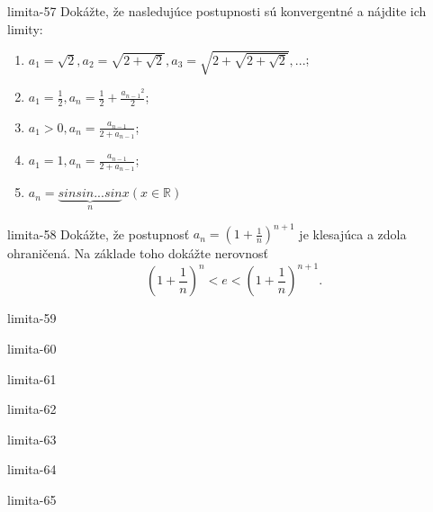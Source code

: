 \begin{defproblem}{limita-57}
Dokážte, že nasledujúce postupnosti sú konvergentné a nájdite ich limity:
\begin{enumerate}
\item $a_1=\sqrt{2}, a_2=\sqrt{2+\sqrt{2}}, a_3=\sqrt{2+\sqrt{2+\sqrt{2}}},...$;
\item $a_1=\frac{1}{2}, a_n=\frac{1}{2}+\frac{{a_{n-1}}^{2}}{2}$;
\item $a_1>0, a_n=\frac{a_{n-1}}{2+a_{n-1}}$;
\item $a_1=1, a_n=\frac{a_{n-1}}{2+a_{n-1}}$;
\item $a_n=\underbrace{sin sin ... sin}_n x (x \in \mathbb{R})$
\end{enumerate}
\end{defproblem}

\begin{defproblem}{limita-58}
Dokážte, že postupnosť $a_{n}=(1+\frac{1}{n})^{n+1}$ je klesajúca a zdola ohraničená. Na základe toho dokážte nerovnosť 
$$(1+\frac{1}{n})^n<e<(1+\frac{1}{n})^{n+1}.$$
\end{defproblem}

\begin{defproblem}{limita-59}

\end{defproblem}

\begin{defproblem}{limita-60}

\end{defproblem}

\begin{defproblem}{limita-61}

\end{defproblem}

\begin{defproblem}{limita-62}

\end{defproblem}

\begin{defproblem}{limita-63}

\end{defproblem}

\begin{defproblem}{limita-64}

\end{defproblem}

\begin{defproblem}{limita-65}

\end{defproblem}

